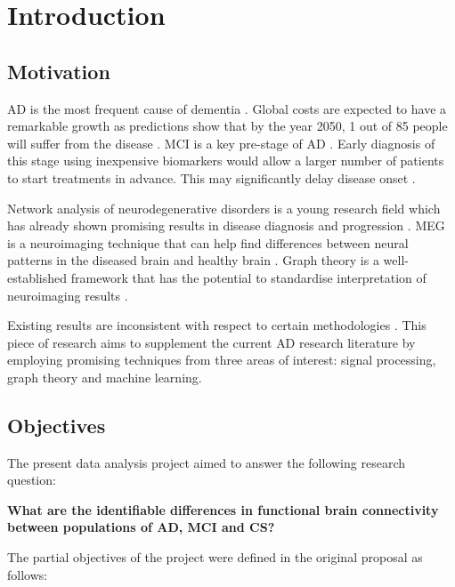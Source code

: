 \chapter{Introduction}






\section{Motivation}
\ac{AD} is the most frequent cause of dementia \autocite{Cummings2004}. Global costs are expected to have a remarkable growth as predictions show that by the year 2050, 1 out of 85 people will suffer from the disease \autocite{Brookmeyer2007}. \ac{MCI} is a key pre-stage of \ac{AD} \autocite{Morris2001}. Early diagnosis of this stage using inexpensive biomarkers would allow a larger number of patients to start treatments in advance. This may significantly delay disease onset \autocite{Cummings2004}.

Network analysis of neurodegenerative disorders is a young research field which has already shown promising results in disease diagnosis and progression \autocite{Zhou2010, Rowe2010DCM}. \ac{MEG} is a neuroimaging technique that can help find differences between neural patterns in the diseased brain and healthy brain \autocite{Stam2010}. Graph theory is a well-established framework that has the potential to standardise interpretation of neuroimaging results \autocite{Stam2010}. 

Existing results are inconsistent with respect to certain methodologies \autocite{Tijms2013}. This piece of research aims to supplement the current \ac{AD} research literature by employing promising techniques from three areas of interest: signal processing, graph theory and machine learning. 

\section{Objectives}
\label{sec:objectives}

The present data analysis project aimed to answer the following research question: 

\begin{center}
	{\textbf{What are the identifiable differences in functional brain connectivity between populations of \ac{AD}, \ac{MCI} and \ac{CS}?}}
\end{center}
The partial objectives of the project were defined in the original proposal \autocite{Stanciu} as follows:


